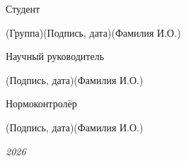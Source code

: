 \documentclass[14pt, russian]{scrartcl}
\begin{document}
\begin{titlepage}
\vspace{\fill}


	\newlength{\ML}

	\noindent Студент \underline{} \hfill \underline{ \hspace{4cm}}\quad

	\vspace{-0.5ex}
	\noindent\hspace{9ex}\scriptsize{(Группа)}\normalsize\hspace{170pt}\hspace{2ex}\scriptsize{(Подпись, дата)}\normalsize\hspace{30pt}\hspace{6ex}\scriptsize{(Фамилия И.О.)}\normalsize

	\bigskip

	\noindent Научный руководитель  \hfill \underline{\hspace{4cm}}\quad

	\vspace{-0.5ex}
	\noindent\hspace{13.5ex}\normalsize\hspace{170pt}\hspace{2ex}\scriptsize{(Подпись, дата)}\normalsize\hspace{30pt}\hspace{6ex}\scriptsize{(Фамилия И.О.)}\normalsize

	\bigskip

	\noindent Нормоконтролёр  \hfill \underline{\hspace{4cm}}\quad

	\vspace{-0.5ex}
	\noindent\hspace{13.5ex}\normalsize\hspace{170pt}\hspace{2ex}\scriptsize{(Подпись, дата)}\normalsize\hspace{30pt}\hspace{6ex}\scriptsize{(Фамилия И.О.)}\normalsize

	\vfill




	\begin{center}
		\textsl{2026}
	\end{center}
\end{titlepage}
\end{document}
